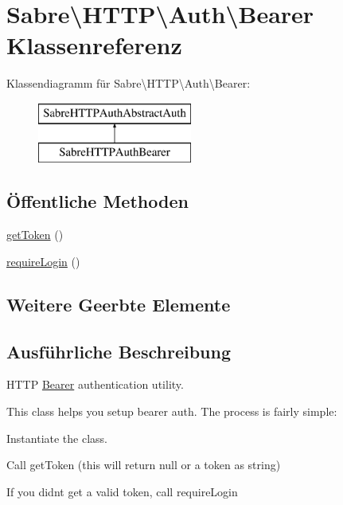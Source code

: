 \hypertarget{class_sabre_1_1_h_t_t_p_1_1_auth_1_1_bearer}{}\section{Sabre\textbackslash{}H\+T\+TP\textbackslash{}Auth\textbackslash{}Bearer Klassenreferenz}
\label{class_sabre_1_1_h_t_t_p_1_1_auth_1_1_bearer}
Klassendiagramm für Sabre\textbackslash{}H\+T\+TP\textbackslash{}Auth\textbackslash{}Bearer\+:\begin{figure}[H]
\begin{center}
\leavevmode
\includegraphics[height=2.000000cm]{class_sabre_1_1_h_t_t_p_1_1_auth_1_1_bearer}
\end{center}
\end{figure}
\subsection*{Öffentliche Methoden}
\begin{DoxyCompactItemize}
\item 
\mbox{\hyperlink{class_sabre_1_1_h_t_t_p_1_1_auth_1_1_bearer_a4daccf2b0072a63872d46c7cdef2746c}{get\+Token}} ()
\item 
\mbox{\hyperlink{class_sabre_1_1_h_t_t_p_1_1_auth_1_1_bearer_a8b5df77b50fc94ce64b11e7ca103573c}{require\+Login}} ()
\end{DoxyCompactItemize}
\subsection*{Weitere Geerbte Elemente}


\subsection{Ausführliche Beschreibung}
H\+T\+TP \mbox{\hyperlink{class_sabre_1_1_h_t_t_p_1_1_auth_1_1_bearer}{Bearer}} authentication utility.

This class helps you setup bearer auth. The process is fairly simple\+:


\begin{DoxyEnumerate}
\item Instantiate the class.
\item Call get\+Token (this will return null or a token as string)
\item If you didn\textquotesingle{}t get a valid token, call \textquotesingle{}require\+Login\textquotesingle{}
\end{DoxyEnumerate}

